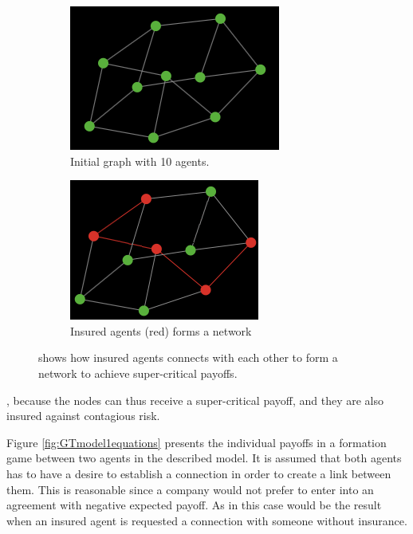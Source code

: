 \begin{figure}[h]
\centering
\begin{subfigure}{.5\textwidth}
  \centering
  \includegraphics[width=0.8\linewidth]{../Figures/financialContagion1.png}
  \caption{\label{fig:fincont1} Initial graph with 10 agents.}
\end{subfigure}
\quad
\begin{subfigure}{.46\textwidth}
  \centering
  \includegraphics[width=0.8\linewidth]{../Figures/financialContagion2.png}
  \caption{\label{fig:fincont2} Insured agents (red) forms a network}
\end{subfigure}
\caption{\label{fig:fincont} shows how insured agents connects with each other to form a network to achieve super-critical payoffs.}
\end{figure}

, because the nodes can thus receive a super-critical payoff, and they are also insured against contagious risk.  

Figure \ref{fig:GTmodel1equations} presents the individual payoffs in a formation game between two agents in the described model. It is assumed that both agents has to have a desire to establish a connection in order to create a link between them. This is reasonable since a company would not prefer to enter into an agreement with negative expected payoff. As in this case would be the result when an insured agent is requested a connection with someone without insurance. 
 
